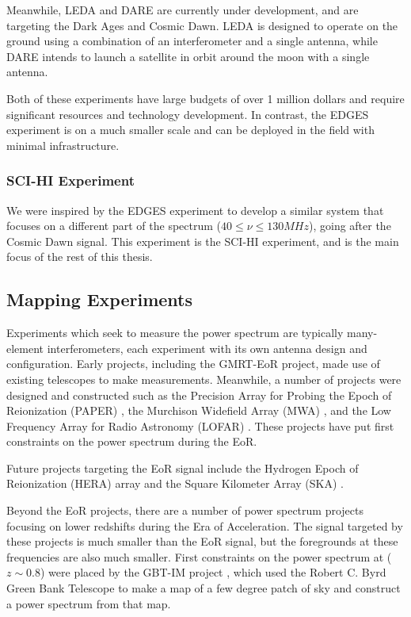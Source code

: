 Meanwhile, LEDA \cite{leda}\cite{bernardi_2014} and DARE \cite{burns_2011} are currently under development, and are targeting the Dark Ages and Cosmic Dawn. LEDA is designed to operate on the ground using a combination of an interferometer and a single antenna, while DARE intends to launch a satellite in orbit around the moon with a single antenna. 

Both of these experiments have large budgets of over 1 million dollars and require significant resources and technology development. In contrast, the EDGES experiment is on a much smaller scale and can be deployed in the field with minimal infrastructure.

\subsubsection{SCI-HI Experiment}

We were inspired by the EDGES experiment to develop a similar system that focuses on a different part of the \cm spectrum ($40 \leq \nu \leq 130 MHz$), going after the Cosmic Dawn signal. This experiment is the SCI-HI experiment, and is the main focus of the rest of this thesis. 


\subsection{Mapping Experiments}

Experiments which seek to measure the \cm power spectrum are typically many-element interferometers, each experiment with its own antenna design and configuration. Early projects, including the GMRT-EoR \cite{paciga_2013} project, made use of existing telescopes to make measurements. Meanwhile, a number of projects were designed and constructed such as the Precision Array for Probing the Epoch of Reionization (PAPER) \cite{pober_2013}\cite{jacobs_2014}, the Murchison Widefield Array (MWA) \cite{bernardi_2013}\cite{tingay_2012}, and the Low Frequency Array for Radio Astronomy (LOFAR) \cite{jelic_2014}\cite{lofar}. These projects have put first constraints on the power spectrum during the EoR. 

Future projects targeting the EoR signal include the Hydrogen Epoch of Reionization (HERA) \cite{hera}\cite{bernardi_2014} array and the Square Kilometer Array (SKA) \cite{ska}.

Beyond the EoR projects, there are a number of power spectrum projects focusing on lower redshifts during the Era of Acceleration. The \cm signal targeted by these projects is much smaller than the EoR signal, but the foregrounds at these frequencies are also much smaller. First constraints on the power spectrum at ($z \sim 0.8$) were placed by the GBT-IM project \cite{masui_2012}\cite{switzer_2013}, which used the Robert C. Byrd Green Bank Telescope to make a map of a few degree patch of sky and construct a power spectrum from that map. 

